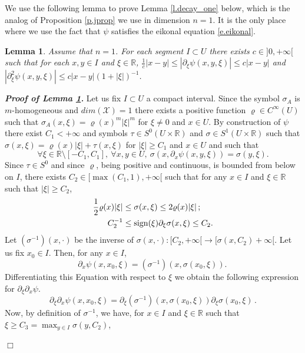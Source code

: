 \documentclass[10pt,twoside]{article}
\newcommand{\R}{\mathbb{R}}
\newcommand{\man}{\mathcal{X}}
\newenvironment{prf}[1][]
{\vskip 2mm  {\it \bf Proof#1. }}{$\Box$ \vskip 2mm}
\numberwithin{theorem}{section}
\newtheorem{lemma}[theorem]{Lemma}
\begin{document}
We use the following lemma to prove Lemma \ref{l.decay_one} below, which is the analog of Proposition \ref{p.jprop} we use in dimension $n=1$. It is the only place where we use the fact that $\psi$ satisfies the eikonal equation \eqref{e.eikonal}.

\begin{lemma}\label{l.dimension_1}
Assume that $n=1$. For each segment $I\subset U$ there exists $c\in]0,+\infty[$ such that for each $x,y\in I$ and $\xi\in\R$, $\frac{1}{c}|x-y|\leq |\partial_\xi\psi(x,y,\xi)|\leq c|x-y|$ and  $|\partial_\xi^2\psi(x,y,\xi)|\leq c|x-y|(1+|\xi|)^{-1}$.
\end{lemma}

\begin{prf}[ of Lemma \ref{l.dimension_1}]
Let us fix $I\subset U$ a compact interval. Since the symbol $\sigma_A$ is $m$-homogeneous and $dim(\man)=1$ there exists a positive function $\varrho\in C^\infty(U)$ such that $\sigma_A(x,\xi)=\varrho(x)^m|\xi|^m$ for $\xi\neq 0$ and $x\in U$. By construction of $\psi$ there exist $C_1<+\infty$ and symbols $\tau\in S^0(U\times\R)$ and $\sigma\in S^1(U\times\R)$ such that $\sigma(x,\xi)=\varrho(x)|\xi|+\tau(x,\xi)$ for $|\xi|\geq C_1$ and $x\in U$ and such that
  \[\forall\xi\in\R\setminus[-C_1,C_1],\ \forall x,y\in U,\ \sigma(x,\partial_x\psi(x,y,\xi))=\sigma(y,\xi).\]
  Since $\tau\in S^0$ and since $\varrho$, being positive and continuous, is bounded from below on $I$, there exists  $C_2\in [\max(C_1,1),+\infty[$ such that for any $x\in I$ and $\xi\in\R$ such that $|\xi|\geq C_2$,
  \begin{align*}
    \frac{1}{2}\varrho(x)|\xi|&\leq\sigma(x,\xi)\leq 2\varrho(x)|\xi|\, ;\\
    C_2^{-1}&\leq \textup{sign}(\xi)\partial_\xi\sigma(x,\xi)\leq C_2.
  \end{align*}
  Let $(\sigma^{-1})(x,\cdot)$ be the inverse of $\sigma(x,\cdot):[C_2,+\infty[\rightarrow[\sigma(x,C_2)+\infty[$. Let us fix $x_0\in I$. Then, for any $x\in I$,
  \begin{equation}\label{e.dim.1}
  \partial_x\psi(x,x_0,\xi)=(\sigma^{-1})(x,\sigma(x_0,\xi)).\,
  \end{equation}
  Differentiating this Equation with respect to $\xi$ we obtain the following expression for $\partial_\xi\partial_x\psi$.
   \[
   \partial_\xi\partial_x\psi(x,x_0,\xi)=\partial_\xi(\sigma^{-1})(x,\sigma(x_0,\xi))\partial_\xi\sigma(x_0,\xi)\, .
   \]
  Now, by definition of $\sigma^{-1}$, we have, for $x\in I$ and $\xi\in\R$ such that $\xi\geq C_3=\max_{y\in I}\sigma(y,C_2)$,

\end{prf}
\end{document}
